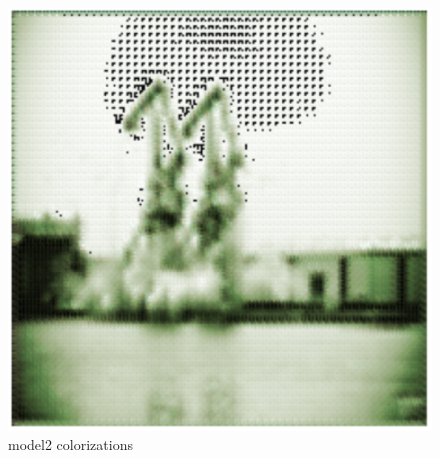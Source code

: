 \documentclass[]{article}
\begin{document}
\begin{figure}[H]
		\includegraphics[scale=0.35]{m2_3.png}
		\caption{model2 colorizations}
	\end{figure}
	
\end{document}
